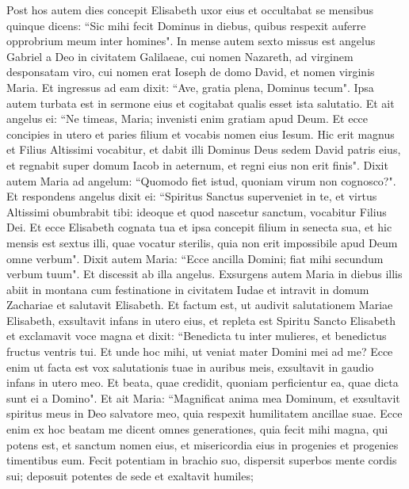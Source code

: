 \begin{biblechapter}
\verse Post hos autem dies concepit Elisabeth uxor eius et occultabat se mensibus quinque dicens: 
\verse “Sic mihi fecit Dominus in diebus, quibus respexit auferre opprobrium meum inter homines". 
\verse In mense autem sexto missus est angelus Gabriel a Deo in civitatem Galilaeae, cui nomen Nazareth, 
\verse ad virginem desponsatam viro, cui nomen erat Ioseph de domo David, et nomen virginis Maria. 
\verse Et ingressus ad eam dixit: “Ave, gratia plena, Dominus tecum". 
\verse Ipsa autem turbata est in sermone eius et cogitabat qualis esset ista salutatio. 
\verse Et ait angelus ei: “Ne timeas, Maria; invenisti enim gratiam apud Deum. 
\verse Et ecce concipies in utero et paries filium et vocabis nomen eius Iesum. 
\verse Hic erit magnus et Filius Altissimi vocabitur, et dabit illi Dominus Deus sedem David patris eius, 
\verse et regnabit super domum Iacob in aeternum, et regni eius non erit finis". 
\verse Dixit autem Maria ad angelum: “Quomodo fiet istud, quoniam virum non cognosco?". 
\verse Et respondens angelus dixit ei: “Spiritus Sanctus superveniet in te, et virtus Altissimi obumbrabit tibi: ideoque et quod nascetur sanctum, vocabitur Filius Dei. 
\verse Et ecce Elisabeth cognata tua et ipsa concepit filium in senecta sua, et hic mensis est sextus illi, quae vocatur sterilis, 
\verse quia non erit impossibile apud Deum omne verbum". 
\verse Dixit autem Maria: “Ecce ancilla Domini; fiat mihi secundum verbum tuum". Et discessit ab illa angelus. 
\verse Exsurgens autem Maria in diebus illis abiit in montana cum festinatione in civitatem Iudae 
\verse et intravit in domum Zachariae et salutavit Elisabeth.  
\verse Et factum est, ut audivit salutationem Mariae Elisabeth, exsultavit infans in utero eius, et repleta est Spiritu Sancto Elisabeth 
\verse et exclamavit voce magna et dixit: “Benedicta tu inter mulieres, et benedictus fructus ventris tui. 
\verse Et unde hoc mihi, ut veniat mater Domini mei ad me? 
\verse Ecce enim ut facta est vox salutationis tuae in auribus meis, exsultavit in gaudio infans in utero meo. 
\verse Et beata, quae credidit, quoniam perficientur ea, quae dicta sunt ei a Domino". 
\verse Et ait Maria: “Magnificat anima mea Dominum, 
\verse et exsultavit spiritus meus in Deo salvatore meo, 
\verse quia respexit humilitatem ancillae suae. Ecce enim ex hoc beatam me dicent omnes generationes, 
\verse quia fecit mihi magna, qui potens est, et sanctum nomen eius, 
\verse et misericordia eius in progenies et progenies timentibus eum. 
\verse Fecit potentiam in brachio suo, dispersit superbos mente cordis sui; 
\verse deposuit potentes de sede et exaltavit humiles; 

\end{biblechapter}
